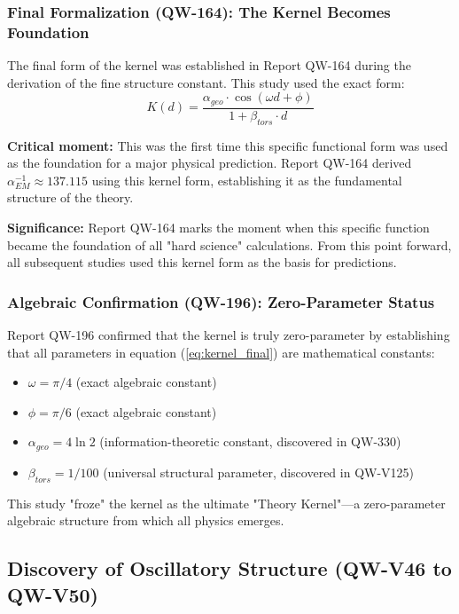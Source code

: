 \documentclass[11pt, a4paper]{article}
\begin{document}
\subsubsection{Final Formalization (QW-164): The Kernel Becomes Foundation}

The final form of the kernel was established in Report QW-164 during the derivation of the fine structure constant. This study used the exact form:
\begin{equation}
K(d) = \frac{\alpha_{geo} \cdot \cos(\omega d + \phi)}{1 + \beta_{tors} \cdot d}
\label{eq:kernel_final}
\end{equation}

\textbf{Critical moment:} This was the first time this specific functional form was used as the foundation for a major physical prediction. Report QW-164 derived $\alpha_{EM}^{-1} \approx 137.115$ using this kernel form, establishing it as the fundamental structure of the theory.

\textbf{Significance:} Report QW-164 marks the moment when this specific function became the foundation of all "hard science" calculations. From this point forward, all subsequent studies used this kernel form as the basis for predictions.

\subsubsection{Algebraic Confirmation (QW-196): Zero-Parameter Status}

Report QW-196 confirmed that the kernel is truly zero-parameter by establishing that all parameters in equation (\ref{eq:kernel_final}) are mathematical constants:
\begin{itemize}
    \item $\omega = \pi/4$ (exact algebraic constant)
    \item $\phi = \pi/6$ (exact algebraic constant)
    \item $\alpha_{geo} = 4\ln 2$ (information-theoretic constant, discovered in QW-330)
    \item $\beta_{tors} = 1/100$ (universal structural parameter, discovered in QW-V125)
\end{itemize}

This study "froze" the kernel as the ultimate "Theory Kernel"—a zero-parameter algebraic structure from which all physics emerges.

\subsection{Discovery of Oscillatory Structure (QW-V46 to QW-V50)}
\end{document}
